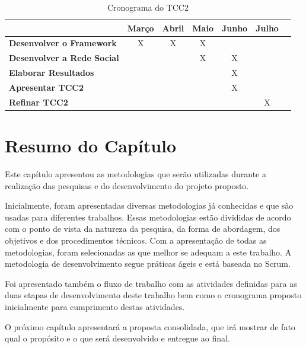 \begin{table}[h]
\centering
\caption{Cronograma do TCC2}
\label{cronograma tcc2}
\begin{tabular}{|l|c|c|c|c|c|c|}
\hline
                                      			& \multicolumn{1}{l|}{\textbf{Março}} & \multicolumn{1}{l|}{\textbf{Abril}} & \multicolumn{1}{l|}{\textbf{Maio}} & \multicolumn{1}{l|}{\textbf{Junho}} & \multicolumn{1}{l|}{\textbf{Julho}} \\ \hline
\textbf{Desenvolver o Framework}                & X                           		  & X                              		& X                            		 &                               	   &                               		 \\ \hline
\textbf{Desenvolver a Rede Social}              &                            		  &                               		& X                            		 & X                              	   &                               		 \\ \hline
\textbf{Elaborar Resultados}				    &                            		  &                              		&                             		 & X                             	   &                               		 \\ \hline
\textbf{Apresentar TCC2}						&                             		  &                              		&                             		 & X                              	   &                               		 \\ \hline
\textbf{Refinar TCC2}				            &                             		  &                               		&                             		 &                               	   & X                             		 \\ \hline
\end{tabular}
\end{table}

\section{Resumo do Capítulo}

Este capítulo apresentou as metodologias que serão utilizadas durante a realização das pesquisas e do desenvolvimento do projeto proposto.

Inicialmente, foram apresentadas diversas metodologias já conhecidas e que são usadas para diferentes trabalhos. Essas metodologias estão divididas de acordo com o ponto de vista da natureza da pesquisa, da forma de abordagem, dos objetivos e dos procedimentos técnicos. Com a apresentação de todas as metodologias, foram selecionadas as que melhor se adequam a este trabalho. A metodologia de desenvolvimento segue práticas ágeis e está baseada no Scrum.

Foi apresentado também o fluxo de trabalho com as atividades definidas para as duas etapas de desenvolvimento deste trabalho bem como o cronograma proposto inicialmente para cumprimento destas atividades.

O próximo capítulo apresentará a proposta consolidada, que irá mostrar de fato qual o propósito e o que será desenvolvido e entregue ao final.
